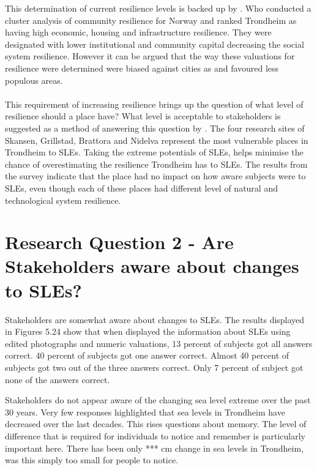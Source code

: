 This determination of current resilience levels is backed up by \cite{opach_seeking_2020}. Who conducted a cluster analysis of community resilience for Norway and ranked Trondheim as having high economic, housing and infrastructure resilience. They were designated with lower institutional and community capital decreasing the social system resilience. However it can be argued that the way these valuations for resilience were determined were biased against cities as and favoured less populous areas.

\paragraph{}
This requirement of increasing resilience brings up the question of what level of resilience should a place have? What level is acceptable to stakeholders is suggested as a method of answering this question by \cite{gerkensmeier_governing_2018}. The four research sites of Skansen, Grillstad, Brattora and Nidelva represent the most vulnerable places in Trondheim to SLEs. Taking the extreme potentials of SLEs, helps minimise the chance of overestimating the resilience Trondheim has to SLEs. The results from the survey indicate that the place had no impact on how aware subjects were to SLEs, even though each of these places had different level of natural and technological system resilience. 




\section{Research Question 2 - Are Stakeholders aware about changes to SLEs?}
Stakeholders are somewhat aware about changes to SLEs. The results displayed in Figures 5.24
show that when displayed the information about SLEs using edited photographs and numeric valuations, 13 percent of subjects got all answers correct. 40 percent of subjects got one answer correct. Almost 40 percent of subjects got two out of the three answers correct. Only 7 percent of subject got none of the answers correct. 

 Stakeholders do not appear aware of the changing sea level extreme over the past 30 years. Very few responses highlighted that sea levels in Trondheim have decreased over the last decades. This rises questions about memory. The level of difference that is required for individuals to notice and remember is particularly important here. There has been only *** cm change in sea levels in Trondheim, was this simply too small for people to notice. 

